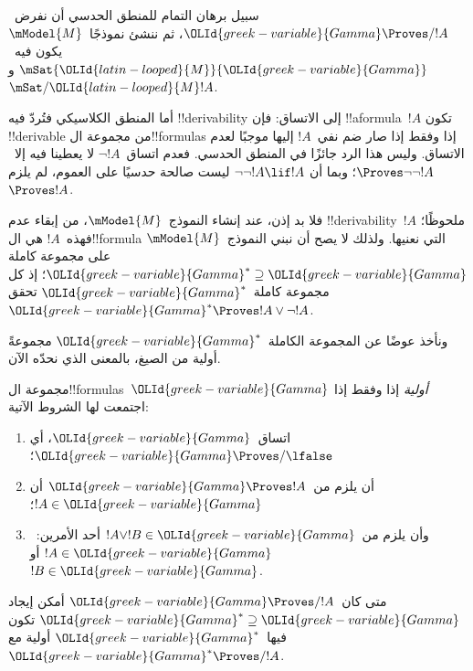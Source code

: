 \documentclass[../../../include/open-logic-section]{subfiles}
\begin{document}


سبيل برهان التمام للمنطق الحدسي أن نفرض~$\OLId{greek-variable}{Gamma} \Proves/ !A$، ثم ننشئ
نموذجًا~$\mModel{M}$ يكون فيه~$\mSat{\OLId{latin-looped}{M}}{\OLId{greek-variable}{Gamma}}$ و$\mSat/{\OLId{latin-looped}{M}}{!A}$.

أما المنطق الكلاسيكي فتُردّ فيه !!{derivability} إلى الاتساق: فإن
!!a{formula}~$!A$ تكون !!{derivable} من مجموعة
ال!!{formula}s إذا وفقط إذا صار ضم نفي~$!A$ إليها موجبًا لعدم الاتساق.
وليس هذا الرد جائزًا في المنطق الحدسي. فعدم اتساق~$\lnot !A$
لا يعطينا فيه إلا~$\Proves \lnot\lnot !A$؛ وبما أن
$\lnot\lnot !A \lif !A$ ليست صالحة حدسيًا على العموم، لم يلزم
$\Proves !A$.

فلا بد إذن، عند إنشاء النموذج~$\mModel{M}$، من إبقاء عدم
!!{derivability}~$!A$ ملحوظًا؛ فهذه~$!A$ هي ال!!{formula} التي نعنيها.
ولذلك لا يصح أن نبني النموذج~$\mModel{M}$ على مجموعة كاملة
$\OLId{greek-variable}{Gamma}^* \supseteq \OLId{greek-variable}{Gamma}$؛ إذ كل مجموعة كاملة~$\OLId{greek-variable}{Gamma}^*$ تحقق
$\OLId{greek-variable}{Gamma}^* \Proves !A \lor \lnot !A$.

ونأخذ عوضًا عن المجموعة الكاملة~$\OLId{greek-variable}{Gamma}^*$ مجموعةً أولية من الصيغ،
بالمعنى الذي نحدّه الآن.

\begin{defn}
  مجموعة ال!!{formula}s~$\OLId{greek-variable}{Gamma}$ \emph{أولية} إذا وفقط إذا اجتمعت لها
  الشروط الآتية:
  \begin{enumerate}
  \item{} اتساق~$\OLId{greek-variable}{Gamma}$، أي
    $\OLId{greek-variable}{Gamma} \Proves/ \lfalse$؛
  \item{} أن يلزم من~$\OLId{greek-variable}{Gamma} \Proves !A$ أن
    $!A \in \OLId{greek-variable}{Gamma}$؛
  \item{} وأن يلزم من~$!A \lor !B \in \OLId{greek-variable}{Gamma}$ أحد
    الأمرين:~$!A \in \OLId{greek-variable}{Gamma}$ أو~$!B \in \OLId{greek-variable}{Gamma}$.
  \end{enumerate}
\end{defn}

\begin{lem}[لمّة ليندنباوم]
   متى كان~$\OLId{greek-variable}{Gamma} \Proves/ !A$ أمكن إيجاد
  $\OLId{greek-variable}{Gamma}^* \supseteq \OLId{greek-variable}{Gamma}$ تكون فيها~$\OLId{greek-variable}{Gamma}^*$ أولية مع
  $\OLId{greek-variable}{Gamma}^* \Proves/ !A$.
\end{lem}
\end{document}
